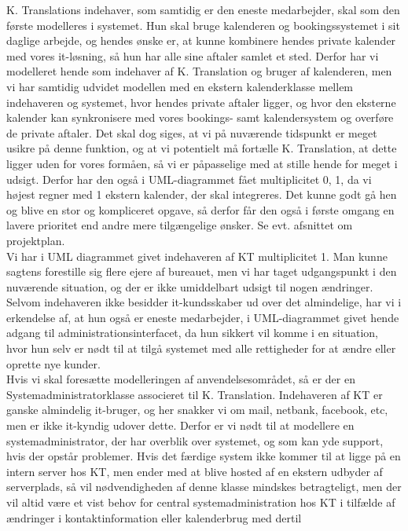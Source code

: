 \documentclass[12pt]{article}
\begin{document}
K. Translations indehaver, som samtidig er den eneste medarbejder, skal som
den første modelleres i systemet. Hun skal bruge kalenderen og
bookingssystemet i sit daglige arbejde, og hendes ønske er, at kunne kombinere
hendes private kalender med vores it-løsning, så hun har alle sine aftaler
samlet et sted. Derfor har vi modelleret hende som indehaver af K.
Translation og bruger af kalenderen, men vi har samtidig udvidet modellen med
en ekstern kalenderklasse mellem indehaveren og systemet, hvor hendes private
aftaler ligger, og hvor den eksterne kalender kan synkronisere med vores
bookings- samt kalendersystem og overføre de private aftaler. Det skal dog
siges, at vi på nuværende tidspunkt er meget usikre på denne funktion, og at
vi potentielt må fortælle K. Translation, at dette ligger uden for vores
formåen, så vi er påpasselige med at stille hende for meget i udsigt. Derfor
har den også i UML-diagrammet fået multiplicitet 0, 1, da vi højest regner med
1 ekstern kalender, der skal integreres. Det kunne godt gå hen og blive en stor
og kompliceret opgave, så derfor får den også i første omgang en lavere prioritet 
end andre mere tilgængelige ønsker. Se evt. afsnittet om projektplan.\\
Vi har i UML diagrammet givet indehaveren af KT multiplicitet 1.
Man kunne sagtens forestille sig flere ejere af bureauet, men vi har taget
udgangspunkt i den nuværende situation, og der er ikke umiddelbart udsigt til 
nogen ændringer. Selvom indehaveren ikke besidder it-kundsskaber ud over det
almindelige, har vi i erkendelse af, at hun også er eneste medarbejder, i
UML-diagrammet givet hende adgang til administrationsinterfacet, da hun sikkert
vil komme i en situation, hvor hun selv er nødt til at tilgå systemet med alle
rettigheder for at ændre eller oprette nye kunder. \\
Hvis vi skal foresætte modelleringen af anvendelsesområdet, så er der en
Systemadministratorklasse associeret til K. Translation. Indehaveren af KT
er ganske almindelig it-bruger, og her snakker vi om mail, netbank, facebook,
etc, men er ikke it-kyndig udover dette. Derfor er vi nødt til at modellere en
systemadministrator, der har overblik over systemet, og som kan yde support,
hvis der opstår problemer. Hvis det færdige system ikke kommer til at ligge på
en intern server hos KT, men ender med at blive hosted af en ekstern udbyder 
af serverplads, så vil nødvendigheden af denne klasse mindskes betragteligt,
men der vil altid være et vist behov for central systemadministration hos KT i
tilfælde af ændringer i kontaktinformation eller kalenderbrug med dertil
\end{document}
